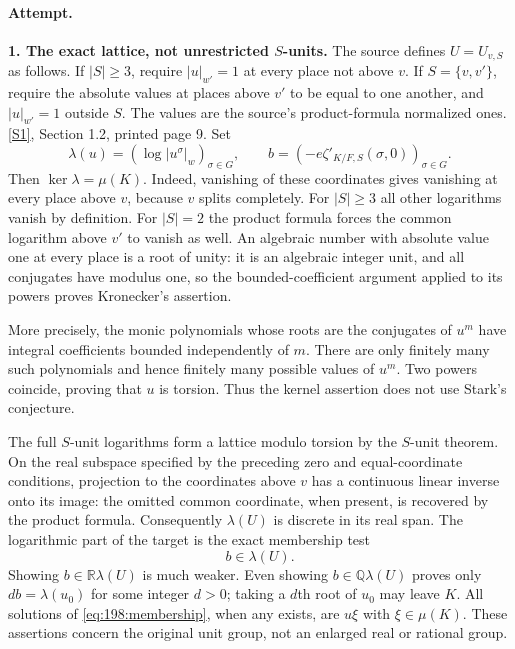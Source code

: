 \documentclass[11pt,a4paper]{article}
\newcommand{\Q}{\mathbb{Q}}
\newcommand{\R}{\mathbb{R}}
\newcommand{\sref}[2]{\hyperlink{source:#1:#2}{[S#2]}}
\numberwithin{equation}{section}
\begin{document}
\paragraph{Attempt.}
\textbf{1. The exact lattice, not unrestricted $S$-units.}
The source defines $U=U_{v,S}$ as follows. If $|S|\ge3$, require
$|u|_{w'}=1$ at every place not above $v$. If $S=\{v,v'\}$, require the
absolute values at places above $v'$ to be equal to one another, and
$|u|_{w'}=1$ outside $S$. The values are the source's product-formula
normalized ones. \sref{198}{1}, Section 1.2, printed page 9.
Set
\begin{equation}\label{eq:198:lattice}
 \lambda(u)=(\log|u^\sigma|_w)_{\sigma\in G},\qquad
 b=(-e\zeta'_{K/F,S}(\sigma,0))_{\sigma\in G}.
\end{equation}
Then $\ker\lambda=\mu(K)$. Indeed, vanishing of these coordinates gives
vanishing at every place above $v$, because $v$ splits completely.
For $|S|\ge3$ all other logarithms vanish by definition. For $|S|=2$
the product formula forces the common logarithm above $v'$ to vanish as
well. An algebraic number with absolute value one at every place is a
root of unity: it is an algebraic integer unit, and all conjugates have
modulus one, so the bounded-coefficient argument applied to its powers
proves Kronecker's assertion.

More precisely, the monic polynomials whose roots are the conjugates of
$u^m$ have integral coefficients bounded independently of $m$. There are
only finitely many such polynomials and hence finitely many possible
values of $u^m$. Two powers coincide, proving that $u$ is torsion.
Thus the kernel assertion does not use Stark's conjecture.

The full $S$-unit logarithms form a lattice modulo torsion by the
$S$-unit theorem. On the real subspace specified by the preceding zero
and equal-coordinate conditions, projection to the coordinates above
$v$ has a continuous linear inverse onto its image: the omitted common
coordinate, when present, is recovered by the product formula.
Consequently $\lambda(U)$ is discrete in its real span. The logarithmic
part of the target is the exact membership test
\begin{equation}\label{eq:198:membership}
                         b\in\lambda(U).
\end{equation}
Showing $b\in\R\lambda(U)$ is much weaker. Even showing
$b\in\Q\lambda(U)$ proves only $db=\lambda(u_0)$ for some integer
$d>0$; taking a $d$th root of $u_0$ may leave $K$. All solutions of
\eqref{eq:198:membership}, when any exists, are $u\xi$ with
$\xi\in\mu(K)$. These assertions concern the original unit group, not
an enlarged real or rational group.
\end{document}
